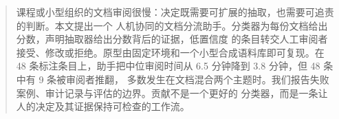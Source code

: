 \begin{abstract}
课程或小型组织的文档审阅很慢：决定既需要可扩展的抽取，也需要可追责的判断。本文提出一个
人机协同的文档分流助手。分类器为每份文档给出分数，声明抽取器给出分数背后的证据，低置信度
的条目转交人工审阅者接受、修改或拒绝。原型由固定环境和一个小型合成语料库即可复现。在 48
条标注条目上，助手把中位审阅时间从 6.5 分钟降到 3.8 分钟，但 48 条中有 9 条被审阅者推翻，
多数发生在文档混合两个主题时。我们报告失败案例、审计记录与评估的边界。贡献不是一个更好的
分类器，而是一条让人的决定及其证据保持可检查的工作流。
\end{abstract}

\SAIReportKeywords{\SAIReportKeywordText}
